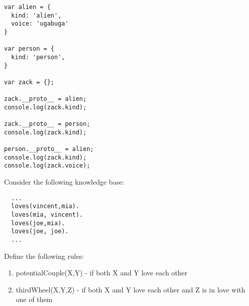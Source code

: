 \documentclass [11pt, a4wide, twoside]{article}
\begin{document}
\begin{verbatim}
var alien = {
  kind: 'alien',
  voice: 'ugabuga'
}

var person = {
  kind: 'person',
}

var zack = {};

zack.__proto__ = alien;
console.log(zack.kind);

zack.__proto__ = person;
console.log(zack.kind);

person.__proto__ = alien;
console.log(zack.kind);
console.log(zack.voice);
\end{verbatim}


\newpage

Consider the following knowledge base:
\begin{verbatim}
  ...
  loves(vincent,mia). 
  loves(mia, vincent). 
  loves(joe,mia).  
  loves(joe, joe).
  ...
\end{verbatim}

Define the following rules:
\begin{enumerate}
\item potentialCouple(X,Y) - if both X and Y love each other
\item thirdWheel(X,Y,Z) - if both X and Y love each other and Z is in love with one of them
\end{enumerate}

\end{document}
